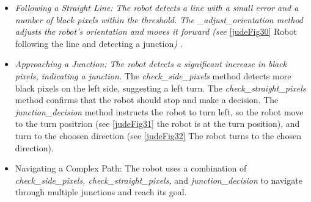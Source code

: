\documentclass[../../main]{subfiles}
\begin{document}
\begin{itemize}
\item
  \emph{Following a Straight Line: The robot detects a line with a small
  error and a number of black pixels within the threshold. The
  \_adjust\_orientation method adjusts the robot's orientation and moves
  it forward (see} \cref{judeFig30} Robot following the line and detecting a
  junction\emph{) .}
\item
  \emph{Approaching a Junction: The robot detects a significant increase
  in black pixels, indicating a junction.} The
  \emph{check\_side\_pixels} method detects more black pixels on the
  left side, suggesting a left turn. The \emph{check\_straight\_pixels}
  method confirms that the robot should stop and make a decision. The
  \emph{junction\_decision} method instructs the robot to turn left, so
  the robot move to the turn positrion (see \cref{judeFig31} the robot is at
  the turn position), and turn to the choosen direction (see \cref{judeFig32}
  The robot turns to the chosen direction).
\item
  Navigating a Complex Path: The robot uses a combination of \\ \emph{
  check\_side\_pixels, check\_straight\_pixels,} and
  \emph{junction\_decision} to navigate through multiple junctions and
  reach its goal.
\end{itemize}
\end{document}
